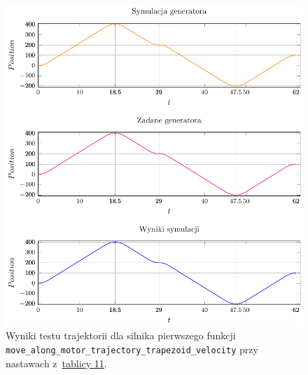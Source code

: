 \documentclass[a4paper, 12pt]{article}
\begin{document}
	\begin{figure}[H]
		\centering
		\includegraphics[scale=1.1]{raport_graphs/simpMTV.pdf}
		\caption{Wyniki testu trajektorii dla silnika pierwszego funkcji \texttt{move\_along\_motor\_trajectory\_trapezoid\_velocity} przy nastawach z~\hyperref[tab:setup5]{tablicy 11}.}
		\label{fig:simpMTV}
	\end{figure}
	
\end{document}
